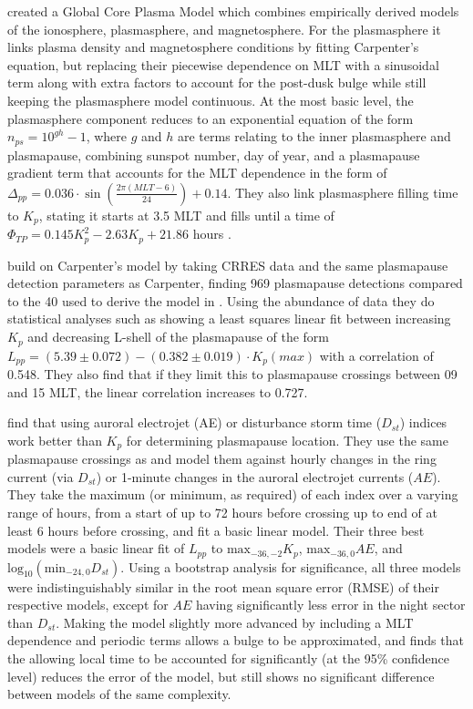 \cite{Gallagher2000GlobalCore} created a Global Core Plasma Model which combines empirically derived models of the ionosphere, plasmasphere, and magnetosphere. For the plasmasphere it links plasma density and magnetosphere conditions by fitting Carpenter's equation, but replacing their piecewise dependence on MLT with a sinusoidal term along with extra factors to account for the post-dusk bulge while still keeping the plasmasphere model continuous. At the most basic level, the plasmasphere component reduces to an exponential equation of the form $n_{ps}=10^{gh}-1$, where $g$ and $h$ are terms relating to the inner plasmasphere and plasmapause, combining sunspot number, day of year, and a plasmapause gradient term that accounts for the MLT dependence in the form of $\Delta_{pp}=0.036\cdot \sin(\frac{2\pi (MLT-6)}{24})+0.14$. They also link plasmasphere filling time to $K_p$, stating it starts at 3.5 MLT and fills until a time of $\Phi_{TP}=0.145K_p^2-2.63K_p+21.86$ hours \citep{Gallagher1995AzimuthalVariation}.

\cite{Moldwin2002ModelPlasmapause} build on Carpenter's model by taking CRRES data and the same plasmapause detection parameters as Carpenter, finding 969 plasmapause detections compared to the 40 used to derive the model in \cite{Carpenter1992ISEEModel}. Using the abundance of data they do statistical analyses such as showing a least squares linear fit between increasing $K_p$ and decreasing L-shell of the plasmapause of the form $L_{pp}=(5.39\pm 0.072)-(0.382\pm 0.019)\cdot K_p(max)$ with a correlation of 0.548. They also find that if they limit this to plasmapause crossings between 09 and 15 MLT, the linear correlation increases to 0.727.

\cite{OBrien2003EmpiricalPlasmapause} find that using auroral electrojet (AE) or disturbance storm time ($D_{st}$) indices work better than $K_p$ for determining plasmapause location. They use the same plasmapause crossings as \cite{Moldwin2002ModelPlasmapause} and model them against hourly changes in the ring current (via $D_{st}$) or 1-minute changes
 in the auroral electrojet currents ($AE$). They take the maximum (or minimum, as required) of each index over a varying range of hours, from a start of up to 72 hours before crossing up to end of at least 6 hours before crossing, and fit a basic linear model. Their three best models were a basic linear fit of $L_{pp}$ to $\text{max}_{-36,-2}K_p$, $\text{max}_{-36,0}AE$, and $\text{log}_{10}(\text{min}_{-24,0}D_{st})$. Using a bootstrap analysis for significance, all three models were indistinguishably similar in the root mean square error (RMSE) of their respective models, except for $AE$ having significantly less error in the night sector than $D_{st}$. Making the model slightly more advanced by including a MLT dependence and periodic terms allows a bulge to be approximated, and finds that the allowing local time to be accounted for significantly (at the 95\% confidence level) reduces the error of the model, but still shows no significant difference between models of the same complexity.

